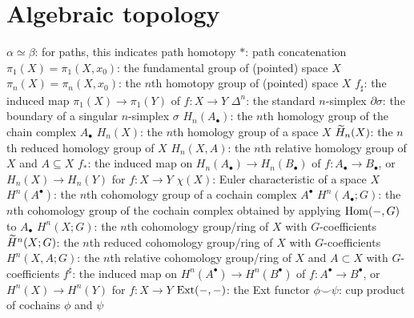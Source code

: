 \section{Algebraic topology}
\begin{itemize}
	\ii $\alpha \simeq \beta$: for paths, this indicates path homotopy
	\ii $\ast$: path concatenation
	\ii $\pi_1(X) = \pi_1(X, x_0)$: the fundamental group of (pointed) space $X$
	\ii $\pi_n(X) = \pi_n(X, x_0)$: the $n$th homotopy group of (pointed) space $X$
	\ii $f_\sharp$: the induced map $\pi_1(X) \to \pi_1(Y)$ of $f \colon X \to Y$
	\ii $\Delta^n$: the standard $n$-simplex
	\ii $\partial\sigma$: the boundary of a singular $n$-simplex $\sigma$
	\ii $H_n(A_\bullet)$: the $n$th homology group of the chain complex $A_\bullet$
	\ii $H_n(X)$: the $n$th homology group of a space $X$
	\ii $\widetilde H_n(X)$: the $n$th reduced homology group of $X$
	\ii $H_n(X, A)$: the $n$th relative homology group of $X$ and $A \subseteq X$
	\ii $f_\ast$: the induced map on $H_n(A_\bullet) \to H_n(B_\bullet)$
	of $f \colon A_\bullet \to B_\bullet$,
	or $H_n(X) \to H_n(Y)$ for $f \colon X \to Y$
	\ii $\chi(X)$: Euler characteristic of a space $X$
	\ii $H^n(A^\bullet)$: the $n$th cohomology group of a cochain complex $A^\bullet$
	\ii $H^n(A_\bullet; G)$: the $n$th cohomology group of the cochain complex
	obtained by applying $\operatorname{Hom}(-,G)$ to $A_\bullet$
	\ii $H^n(X; G)$: the $n$th cohomology group/ring of $X$ with $G$-coefficients
	\ii $\widetilde H^n(X; G)$: the $n$th reduced cohomology group/ring of $X$ with $G$-coefficients
	\ii $H^n(X,A ; G)$: the $n$th relative cohomology group/ring of $X$ and $A \subset X$ with $G$-coefficients
	\ii $f^\sharp$: the induced map on $H^n(A^\bullet) \to H^n(B^\bullet)$
	of $f \colon A^\bullet \to B^\bullet$,
	or $H^n(X) \to H^n(Y)$ for $f \colon X \to Y$
	\ii $\operatorname{Ext}(-,-)$: the Ext functor
	\ii $\phi \smile \psi$: cup product of cochains $\phi$ and $\psi$
\end{itemize}

